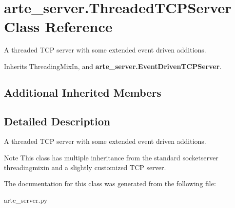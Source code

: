 \section{arte\+\_\+server.\+Threaded\+T\+C\+P\+Server Class Reference}
\label{classarte__server_1_1_threaded_t_c_p_server}


A threaded T\+CP server with some extended event driven additions.  




Inherits Threading\+Mix\+In, and {\bf arte\+\_\+server.\+Event\+Driven\+T\+C\+P\+Server}.

\subsection*{Additional Inherited Members}


\subsection{Detailed Description}
A threaded T\+CP server with some extended event driven additions. 

\begin{DoxyNote}{Note}
This class has multiple inheritance from the standard socketserver threadingmixin and a slightly customized T\+CP server. 
\end{DoxyNote}


The documentation for this class was generated from the following file\+:\begin{DoxyCompactItemize}
\item 
arte\+\_\+server.\+py\end{DoxyCompactItemize}
